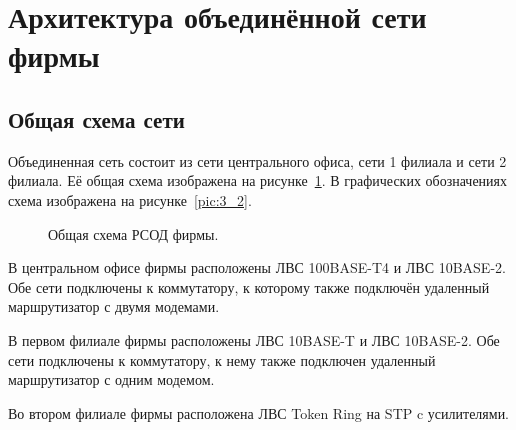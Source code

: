 \newpage

\section{Архитектура объединённой сети фирмы}

\subsection{Общая схема сети}

Объединенная сеть состоит из сети центрального офиса, сети 1 филиала и сети 2 филиала. Её общая схема изображена на рисунке~\ref{pic:3_1}. В графических обозначениях схема изображена на рисунке~\ref{pic:3_2}.

\begin{figure}[h]
\caption{Общая схема РСОД фирмы.}
\label{pic:3_1}
\end{figure}

В центральном офисе фирмы расположены ЛВС 100BASE-T4 и ЛВС 10BASE-2. Обе сети подключены к коммутатору, к которому также подключён удаленный маршрутизатор с двумя модемами.\par\bigskip

В первом филиале фирмы расположены ЛВС 10BASE-T и ЛВС 10BASE-2. Обе сети подключены к коммутатору, к нему также подключен удаленный маршрутизатор с одним модемом.\par\bigskip

\newpage

Во втором филиале фирмы расположена ЛВС Token Ring на STP c усилителями.

